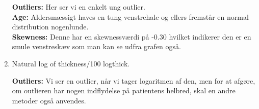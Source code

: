 \begin{enumerate}
\textbf{Outliers: }Her ser vi en enkelt ung outlier.\\ 
\textbf{Age: } Aldersmæssigt haves en tung venstrehale og ellers fremstår en normal distribution nogenlunde.\\
\textbf{Skewness:} Denne har en skewnessværdi på -0.30 hvilket indikerer den er en smule venstreskæv som man kan se udfra grafen også.
\newpage
\item Natural log of thickness/100 logthick.
\begin{figure}[h]
    \centering
    \hfill
  \hfill
\end{figure}

\textbf{Outliers:} Vi ser en outlier, når vi tager logaritmen af den, men for at afgøre, om outlieren har nogen indflydelse på patientens helbred, skal en andre metoder også anvendes.\\


\end{enumerate}
